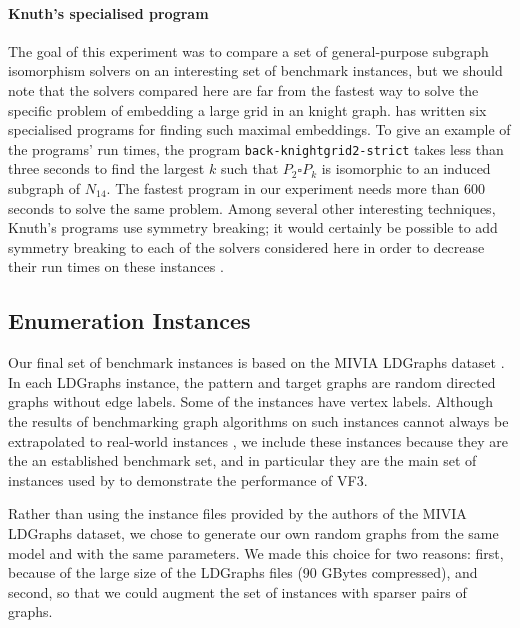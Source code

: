 \paragraph{Knuth's specialised program}
The goal of this experiment was to compare a set of general-purpose subgraph isomorphism
solvers on an interesting set of benchmark instances, but we should note that the solvers
compared here are far from the fastest way to solve the specific problem of embedding
a large grid in an knight graph.
\citet{knuth2022art} has written six specialised
programs for finding such maximal embeddings.  To give an example of the programs' run times,
the program \texttt{back-knightgrid2-strict} takes less than
three seconds to find the largest $k$ such that $P_2 \square P_k$
is isomorphic to an induced subgraph of $N_{14}$. The fastest
program in our experiment needs more than 600 seconds to solve the same problem.
Among several other interesting techniques, Knuth's programs use symmetry breaking;
it would certainly be possible to add symmetry breaking to each of the solvers considered
here in order to decrease their run times on these instances \citep{zampelli2007symmetry}.

\FloatBarrier

\subsection{Enumeration Instances}\label{subsec:si-enumeration-experiment}

Our final set of benchmark instances is based on the MIVIA LDGraphs dataset
\citep{DBLP:journals/pami/CarlettiFSV18}.  In each LDGraphs instance, the pattern and
target graphs are random directed graphs without edge labels.
Some of the instances have vertex labels.
Although the results of benchmarking graph algorithms on such instances cannot
always be extrapolated to real-world instances \citep{DBLP:conf/cp/McCreeshPST17},
we include these instances because they are the an established benchmark set,
and in particular they are the main set of instances used by \cite{DBLP:journals/pami/CarlettiFSV18}
to demonstrate the performance of VF3.

Rather than using the instance files provided by the authors of the MIVIA LDGraphs
dataset, we chose to generate our own random graphs from the same model and with the
same parameters.  We made this choice for two reasons: first, because of the large size
of the LDGraphs files (90 GBytes compressed), and second, so that we could augment
the set of instances with sparser pairs of graphs.

